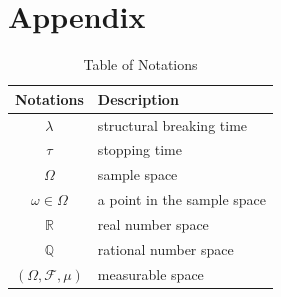 \documentclass[a4paper]{article}
\theoremstyle{plain}
\begin{document}
\section*{Appendix}
\begin{table}[H]
	\footnotesize
	\centering
	\begin{tabular}{c l}
		\hline
		\hline
		Notations             & Description \\
		\hline
		$\lambda$	& structural breaking time \\
		$\tau$	& stopping time\\
		$\Omega$& sample space\\
		$\omega \in \Omega$& a point in the sample space\\
		$\mathbb{R}$ & real number space\\
		$\mathbb{Q}$ & rational number space\\
		$(\Omega,\mathcal{F},\mu)$ & measurable space\\
		\hline
		\hline
	\end{tabular}
	\protect\caption{\label{notations}Table of Notations}
	\end{table}


\end{document}
